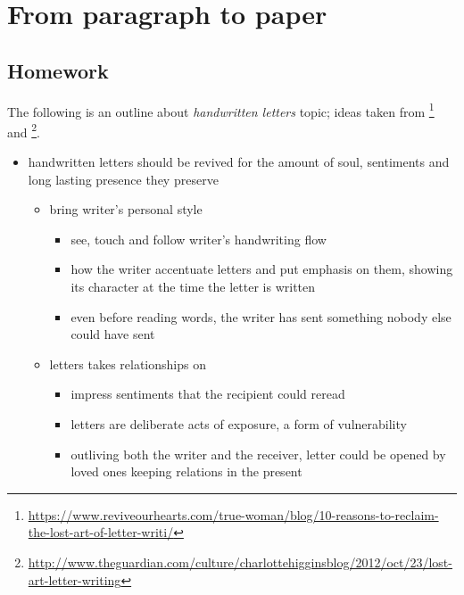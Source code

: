 

\chapter{From paragraph to paper}

\section{Homework}

The following is an outline about \emph{handwritten letters} topic; ideas taken from 
\footnote{\url{https://www.reviveourhearts.com/true-woman/blog/10-reasons-to-reclaim-the-lost-art-of-letter-writi/}}
and \footnote{\url{http://www.theguardian.com/culture/charlottehigginsblog/2012/oct/23/lost-art-letter-writing}}.

\begin{itemize}
    \item handwritten letters should be revived for the amount of soul, sentiments and
            long lasting presence they preserve

    \begin{itemize}
        
        \item bring writer's personal style

            \begin{itemize}
                \item see, touch and follow writer's handwriting flow
                \item how the writer accentuate letters and put emphasis on them, showing its 
                        character at the time the letter is written
                \item even before reading words, the writer has sent something nobody else 
                        could have sent
            \end{itemize}

        \item letters takes relationships on

            \begin{itemize}
                \item impress sentiments that the recipient could reread
                \item letters are deliberate acts of exposure, a form of vulnerability
                \item outliving both the writer and the receiver, letter could
                        be opened by loved ones keeping relations in the present
            \end{itemize}


\end{itemize}
\end{itemize}
